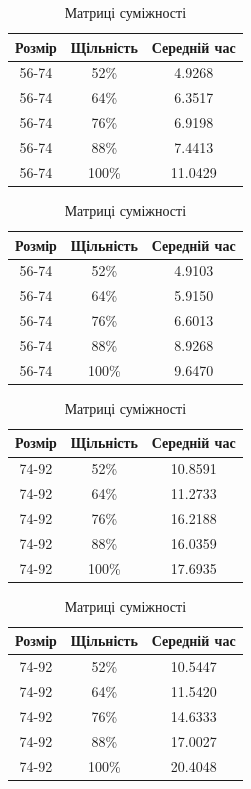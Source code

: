 \documentclass[12pt, letterpaper, twoside]{article}
\begin{document}
\begin{table}[htbp]
\begin{minipage}[b]{0.5\linewidth}
\begin{tabular}{|c|c|c|}
\hline
Розмір & Щільність & Середній час\\
\hline
56-74 & 52\% & 4.9268 \\
56-74 & 64\% & 6.3517 \\
56-74 & 76\% & 6.9198 \\
56-74 & 88\% & 7.4413 \\
56-74 & 100\% & 11.0429 \\
\hline
\end{tabular}
\caption{Списки суміжності}
\end{minipage}
\begin{minipage}[b]{0.5\linewidth}
\begin{tabular}{|c|c|c|}
\hline
Розмір & Щільність & Середній час\\
\hline
56-74 & 52\% & 4.9103 \\
56-74 & 64\% & 5.9150 \\
56-74 & 76\% & 6.6013 \\
56-74 & 88\% & 8.9268 \\
56-74 & 100\% & 9.6470 \\
\hline
\end{tabular}
\caption{Матриці суміжності}
\end{minipage}
\end{table}
\begin{table}[htbp]
\begin{minipage}[b]{0.5\linewidth}
\begin{tabular}{|c|c|c|}
\hline
Розмір & Щільність & Середній час\\
\hline
74-92 & 52\% & 10.8591 \\
74-92 & 64\% & 11.2733 \\
74-92 & 76\% & 16.2188 \\
74-92 & 88\% & 16.0359 \\
74-92 & 100\% & 17.6935 \\
\hline
\end{tabular}
\caption{Списки суміжності}
\end{minipage}
\begin{minipage}[b]{0.5\linewidth}
\begin{tabular}{|c|c|c|}
\hline
Розмір & Щільність & Середній час\\
\hline
74-92 & 52\% & 10.5447 \\
74-92 & 64\% & 11.5420 \\
74-92 & 76\% & 14.6333 \\
74-92 & 88\% & 17.0027 \\
74-92 & 100\% & 20.4048 \\
\hline
\end{tabular}
\caption{Матриці суміжності}
\end{minipage}
\end{table}
\end{document}
